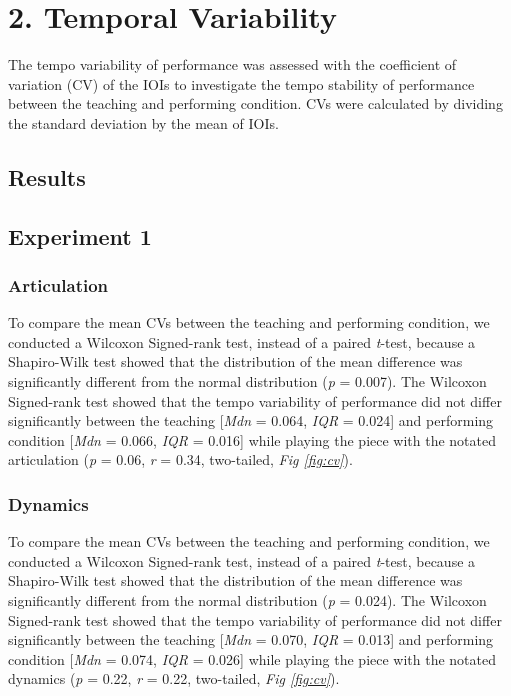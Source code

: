 \documentclass[
  man,floatsintext]{apa6}
\begin{document}
\clearpage

\hypertarget{temporal-variability}{%
\section{2. Temporal Variability}\label{temporal-variability}}

The tempo variability of performance was assessed with the coefficient of variation (CV) of the IOIs to investigate the tempo stability of performance between the teaching and performing condition. CVs were calculated by dividing the standard deviation by the mean of IOIs.

\hypertarget{results-2}{%
\subsection{Results}\label{results-2}}

\hypertarget{experiment-1-2}{%
\subsection{Experiment 1}\label{experiment-1-2}}

\hypertarget{articulation-2}{%
\subsubsection{Articulation}\label{articulation-2}}

To compare the mean CVs between the teaching and performing condition, we conducted a Wilcoxon Signed-rank test, instead of a paired \emph{t}-test, because a Shapiro-Wilk test showed that the distribution of the mean difference was significantly different from the normal distribution (\emph{p} = 0.007). The Wilcoxon Signed-rank test showed that the tempo variability of performance did not differ significantly between the teaching {[}\emph{Mdn} = 0.064, \emph{IQR} = 0.024{]} and performing condition {[}\emph{Mdn} = 0.066, \emph{IQR} = 0.016{]} while playing the piece with the notated articulation (\emph{p} = 0.06, \emph{r} = 0.34, two-tailed, \emph{Fig \ref{fig:cv}}).

\hypertarget{dynamics-2}{%
\subsubsection{Dynamics}\label{dynamics-2}}

To compare the mean CVs between the teaching and performing condition, we conducted a Wilcoxon Signed-rank test, instead of a paired \emph{t}-test, because a Shapiro-Wilk test showed that the distribution of the mean difference was significantly different from the normal distribution (\emph{p} = 0.024). The Wilcoxon Signed-rank test showed that the tempo variability of performance did not differ significantly between the teaching {[}\emph{Mdn} = 0.070, \emph{IQR} = 0.013{]} and performing condition {[}\emph{Mdn} = 0.074, \emph{IQR} = 0.026{]} while playing the piece with the notated dynamics (\emph{p} = 0.22, \emph{r} = 0.22, two-tailed, \emph{Fig \ref{fig:cv}}).
\end{document}
